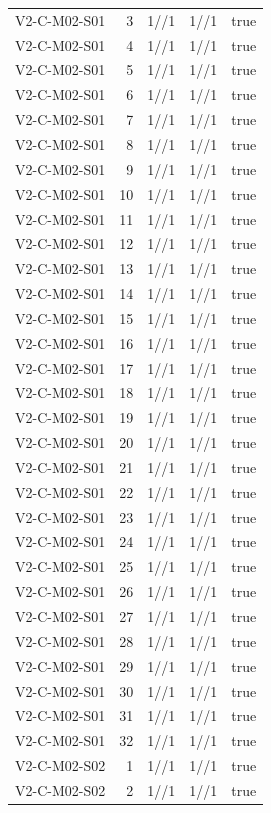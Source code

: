 {\begin{longtable}{lrrrr}
V2-C-M02-S01 & 3 & 1//1 & 1//1 & true \\
V2-C-M02-S01 & 4 & 1//1 & 1//1 & true \\
V2-C-M02-S01 & 5 & 1//1 & 1//1 & true \\
V2-C-M02-S01 & 6 & 1//1 & 1//1 & true \\
V2-C-M02-S01 & 7 & 1//1 & 1//1 & true \\
V2-C-M02-S01 & 8 & 1//1 & 1//1 & true \\
V2-C-M02-S01 & 9 & 1//1 & 1//1 & true \\
V2-C-M02-S01 & 10 & 1//1 & 1//1 & true \\
V2-C-M02-S01 & 11 & 1//1 & 1//1 & true \\
V2-C-M02-S01 & 12 & 1//1 & 1//1 & true \\
V2-C-M02-S01 & 13 & 1//1 & 1//1 & true \\
V2-C-M02-S01 & 14 & 1//1 & 1//1 & true \\
V2-C-M02-S01 & 15 & 1//1 & 1//1 & true \\
V2-C-M02-S01 & 16 & 1//1 & 1//1 & true \\
V2-C-M02-S01 & 17 & 1//1 & 1//1 & true \\
V2-C-M02-S01 & 18 & 1//1 & 1//1 & true \\
V2-C-M02-S01 & 19 & 1//1 & 1//1 & true \\
V2-C-M02-S01 & 20 & 1//1 & 1//1 & true \\
V2-C-M02-S01 & 21 & 1//1 & 1//1 & true \\
V2-C-M02-S01 & 22 & 1//1 & 1//1 & true \\
V2-C-M02-S01 & 23 & 1//1 & 1//1 & true \\
V2-C-M02-S01 & 24 & 1//1 & 1//1 & true \\
V2-C-M02-S01 & 25 & 1//1 & 1//1 & true \\
V2-C-M02-S01 & 26 & 1//1 & 1//1 & true \\
V2-C-M02-S01 & 27 & 1//1 & 1//1 & true \\
V2-C-M02-S01 & 28 & 1//1 & 1//1 & true \\
V2-C-M02-S01 & 29 & 1//1 & 1//1 & true \\
V2-C-M02-S01 & 30 & 1//1 & 1//1 & true \\
V2-C-M02-S01 & 31 & 1//1 & 1//1 & true \\
V2-C-M02-S01 & 32 & 1//1 & 1//1 & true \\
V2-C-M02-S02 & 1 & 1//1 & 1//1 & true \\
V2-C-M02-S02 & 2 & 1//1 & 1//1 & true \\

\end{longtable}}
